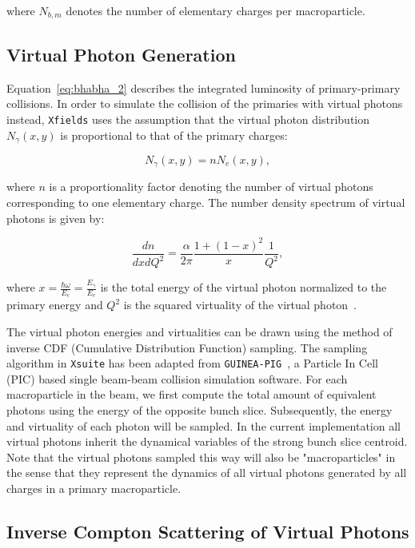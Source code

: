 where $N_{b,m}$ denotes the number of elementary charges per macroparticle.

\subsection{Virtual Photon Generation}

Equation~\eqref{eq:bhabha_2} describes the integrated luminosity of primary-primary collisions. In order to simulate the collision of the primaries with virtual photons instead, \texttt{Xfields} uses the assumption that the virtual photon distribution $N_{\gamma}(x,y)$ is proportional to that of the primary charges:

\begin{equation}
	N_{\gamma}(x,y) = nN_e(x,y),
	\label{eq:bhabha_3}
\end{equation}

where $n$ is a proportionality factor denoting the number of virtual photons corresponding to one elementary charge. The number density spectrum of virtual photons is given by:

\begin{equation}
	\frac{dn}{dxdQ^2} = \frac{\alpha}{2\pi}\frac{1 + (1 - x)^2}{x}\frac{1}{Q^2},
	\label{eq:bhabha_4}
\end{equation}

where $\displaystyle x=\frac{\hbar\omega}{E_e}=\frac{E_\gamma}{E_e}$ is the total energy of the virtual photon normalized to the primary energy and $Q^2$ is the squared virtuality of the virtual photon~\cite{Halzen:1984mc}. 

The virtual photon energies and virtualities can be drawn using the method of inverse CDF (Cumulative Distribution Function) sampling. The sampling algorithm in \texttt{Xsuite} has been adapted from \texttt{GUINEA-PIG}~\cite{guineapig}, a Particle In Cell (PIC) based single beam-beam collision simulation software. For each macroparticle in the beam, we first compute the total amount of equivalent photons using the energy of the opposite bunch slice. Subsequently, the energy and virtuality of each photon will be sampled. In the current implementation all virtual photons inherit the dynamical variables of the strong bunch slice centroid. Note that the virtual photons sampled this way will also be "macroparticles" in the sense that they represent the dynamics of all virtual photons generated by all charges in a primary macroparticle.

\subsection{Inverse Compton Scattering of Virtual Photons}

